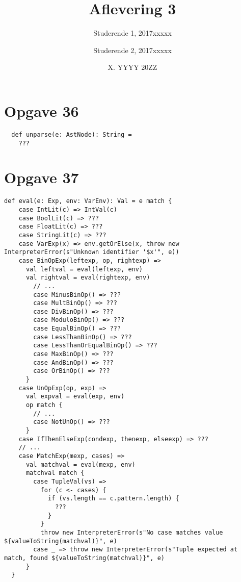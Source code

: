 \documentclass[a4paper, 10pt]{article}
\title{Aflevering 3}
\author{Studerende 1, 2017xxxxx \and Studerende 2, 2017xxxxx}
\date{X. YYYY 20ZZ}
\begin{document}
\maketitle
\section*{Opgave 36}
\begin{lstlisting}
  def unparse(e: AstNode): String =
    ???
\end{lstlisting}
\section*{Opgave 37}
\begin{lstlisting}
def eval(e: Exp, env: VarEnv): Val = e match {
    case IntLit(c) => IntVal(c)
    case BoolLit(c) => ???
    case FloatLit(c) => ???
    case StringLit(c) => ???
    case VarExp(x) => env.getOrElse(x, throw new InterpreterError(s"Unknown identifier '$x'", e))
    case BinOpExp(leftexp, op, rightexp) =>
      val leftval = eval(leftexp, env)
      val rightval = eval(rightexp, env)
        // ...
        case MinusBinOp() => ???
        case MultBinOp() => ???
        case DivBinOp() => ???
        case ModuloBinOp() => ???
        case EqualBinOp() => ???
        case LessThanBinOp() => ???
        case LessThanOrEqualBinOp() => ???
        case MaxBinOp() => ???
        case AndBinOp() => ???
        case OrBinOp() => ???
      }
    case UnOpExp(op, exp) =>
      val expval = eval(exp, env)
      op match {
        // ...
        case NotUnOp() => ???
      }
    case IfThenElseExp(condexp, thenexp, elseexp) => ???
    // ...
    case MatchExp(mexp, cases) =>
      val matchval = eval(mexp, env)
      matchval match {
        case TupleVal(vs) =>
          for (c <- cases) {
            if (vs.length == c.pattern.length) {
              ???
            }
          }
          throw new InterpreterError(s"No case matches value ${valueToString(matchval)}", e)
        case _ => throw new InterpreterError(s"Tuple expected at match, found ${valueToString(matchval)}", e)
      }
  }
\end{lstlisting}
\end{document}
